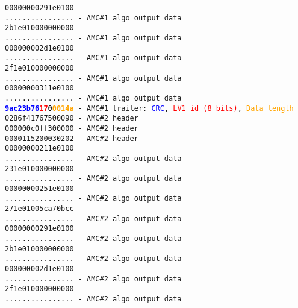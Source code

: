 \texttt{00000000291e0100}\\
\texttt{................ - AMC\#1 algo output data}\\
\texttt{2b1e010000000000}\\
\texttt{................ - AMC\#1 algo output data}\\
\texttt{000000002d1e0100}\\
\texttt{................ - AMC\#1 algo output data}\\
\texttt{2f1e010000000000}\\
\texttt{................ - AMC\#1 algo output data}\\
\texttt{00000000311e0100}\\
\texttt{................ - AMC\#1 algo output data}\\
\texttt{\textcolor{blue}{\textbf{9ac23b76}}\textcolor{red}{\textbf{17}}\textcolor{black}{0}\textcolor{orange}{\textbf{0014a}} - AMC\#1 trailer: \textcolor{blue}{CRC}, \textcolor{red}{LV1 id (8 bits)}, \textcolor{orange}{Data length}}\\
\texttt{0286f41767500090 - AMC\#2 header} \\
\texttt{000000c0ff300000 - AMC\#2 header} \\
\texttt{0000115200030202 - AMC\#2 header} \\
\texttt{00000000211e0100}\\
\texttt{................ - AMC\#2 algo output data}\\
\texttt{231e010000000000}\\
\texttt{................ - AMC\#2 algo output data}\\
\texttt{00000000251e0100}\\
\texttt{................ - AMC\#2 algo output data}\\
\texttt{271e01005ca70bcc}\\
\texttt{................ - AMC\#2 algo output data}\\
\texttt{00000000291e0100}\\
\texttt{................ - AMC\#2 algo output data}\\
\texttt{2b1e010000000000}\\
\texttt{................ - AMC\#2 algo output data}\\
\texttt{000000002d1e0100}\\
\texttt{................ - AMC\#2 algo output data}\\
\texttt{2f1e010000000000}\\
\texttt{................ - AMC\#2 algo output data}\\
